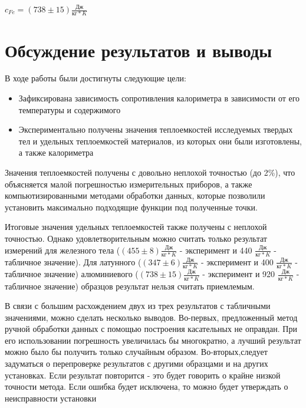 \documentclass[12pt,a4paper]{article}
\begin{document}
$c_{Fe} = (738 \pm 15)\frac{\text{Дж}}{\text{кг}*K}$

\newpage

\section{Обсуждение результатов и выводы}
В ходе работы были достигнуты следующие цели:
\begin{itemize}
\item Зафиксирована зависимость сопротивления калориметра в зависимости от его температуры и содержимого
\item Экспериментально получены значения теплоемкостей исследуемых твердых тел и удельных теплоемкостей материалов, из которых они были изготовлены, а также калориметра  
\end{itemize}

Значения теплоемкостей получены с довольно неплохой точностью (до 2\%), что объясняется малой погрешностью измерительных приборов, а также компьютизированными методами обработки данных, которые позволили установить максимально подходящие функции под полученные точки.  

Итоговые значения удельных теплоемкостей также получены с неплохой точностью. Однако удовлетворительным можно считать только результат измерений для железного тела ($(455 \pm 8)\frac{\text{Дж}}{\text{кг}*K}$ - эксперимент и 440 $\frac{\text{Дж}}{\text{кг}*K}$ - табличное значение). Для латунного ($(347 \pm 6)\frac{\text{Дж}}{\text{кг}*K}$ - эксперимент и 400 $\frac{\text{Дж}}{\text{кг}*K}$ - табличное значение) алюминиевого ($(738 \pm 15)\frac{\text{Дж}}{\text{кг}*K}$ - эксперимент и 920 $\frac{\text{Дж}}{\text{кг}*K}$ - табличное значение) образцов результат нельзя считать приемлемым. 

В связи с большим расхождением двух из трех результатов с табличными значениями, можно сделать несколько выводов. Во-первых, предложенный метод ручной обработки данных с помощью построения касательных не оправдан. При его использовании погрешность увеличилась бы многократно, а лучший результат можно было бы получить только случайным образом. Во-вторых,следует задуматься о перепроверке результатов с другими образцами и на других установках. Если результат повторится - это будет говорить о крайне низкой точности метода. Если ошибка будет исключена, то можно будет утверждать о неисправности установки 
\end{document}
